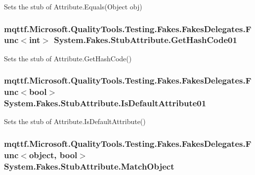 Sets the stub of Attribute.\-Equals(\-Object obj)

\hypertarget{class_system_1_1_fakes_1_1_stub_attribute_aaace4e2752ae36cd7cdc46cf465f70a9}{
\subsubsection[{Get\-Hash\-Code01}]{\setlength{\rightskip}{0pt plus 5cm}mqttf.\-Microsoft.\-Quality\-Tools.\-Testing.\-Fakes.\-Fakes\-Delegates.\-Func$<$int$>$ System.\-Fakes.\-Stub\-Attribute.\-Get\-Hash\-Code01}}\label{class_system_1_1_fakes_1_1_stub_attribute_aaace4e2752ae36cd7cdc46cf465f70a9}


Sets the stub of Attribute.\-Get\-Hash\-Code()

\hypertarget{class_system_1_1_fakes_1_1_stub_attribute_ab7cd4a22cf53952f7d50d5a963eb33de}{
\subsubsection[{Is\-Default\-Attribute01}]{\setlength{\rightskip}{0pt plus 5cm}mqttf.\-Microsoft.\-Quality\-Tools.\-Testing.\-Fakes.\-Fakes\-Delegates.\-Func$<$bool$>$ System.\-Fakes.\-Stub\-Attribute.\-Is\-Default\-Attribute01}}\label{class_system_1_1_fakes_1_1_stub_attribute_ab7cd4a22cf53952f7d50d5a963eb33de}


Sets the stub of Attribute.\-Is\-Default\-Attribute()

\hypertarget{class_system_1_1_fakes_1_1_stub_attribute_a72be9660fb043877a527f44d19efb781}{
\subsubsection[{Match\-Object}]{\setlength{\rightskip}{0pt plus 5cm}mqttf.\-Microsoft.\-Quality\-Tools.\-Testing.\-Fakes.\-Fakes\-Delegates.\-Func$<$object, bool$>$ System.\-Fakes.\-Stub\-Attribute.\-Match\-Object}}\label{class_system_1_1_fakes_1_1_stub_attribute_a72be9660fb043877a527f44d19efb781}


